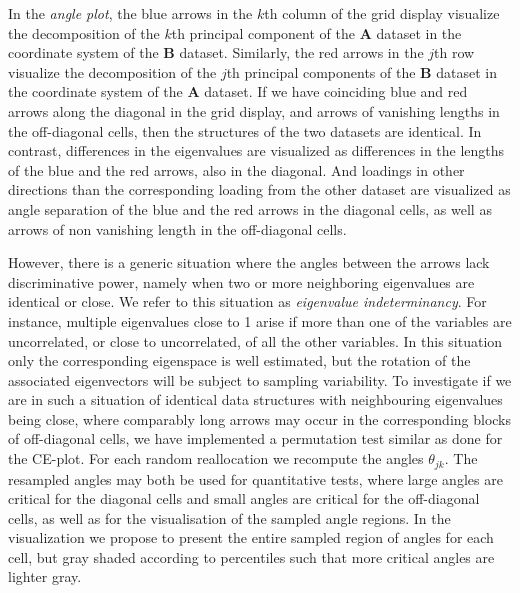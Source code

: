 \documentclass[]{interact}
\theoremstyle{plain}%
\theoremstyle{definition}
\theoremstyle{remark}
\begin{document}
In the \emph{angle plot}, the blue arrows in the $k$th column of the grid display visualize the decomposition of the $k$th principal component of the $\mathbf{A}$ dataset in the coordinate system of the $\mathbf{B}$ dataset. Similarly, the red arrows in the $j$th row visualize the decomposition of the $j$th principal components of the $\mathbf{B}$ dataset in the coordinate system of the $\mathbf{A}$ dataset. If we have coinciding blue and red arrows along the diagonal in the grid display, and arrows of vanishing lengths in the off-diagonal cells, then the structures of the two datasets are identical. In contrast, differences in the eigenvalues are visualized as differences in the lengths of the blue and the red arrows, also in the diagonal. And loadings in other directions than the corresponding loading from the other dataset are visualized as angle separation of the blue and the red arrows in the diagonal cells, as well as arrows of non vanishing length in the off-diagonal cells.

However, there is a generic situation where the angles between the arrows lack discriminative power, namely when two or more neighboring eigenvalues are identical or close. We refer to this situation as \textit{eigenvalue indeterminancy}. For instance, multiple eigenvalues close to 1 arise if more than one of the variables are uncorrelated, or close to uncorrelated, of all the other variables. In this situation only the corresponding eigenspace is well estimated, but the rotation of the associated eigenvectors will be subject to sampling variability. To investigate if we are in such a situation of identical data structures with neighbouring eigenvalues being close, where comparably long arrows may occur in the corresponding blocks of off-diagonal cells, we have implemented a permutation test similar as done for the CE-plot. For each random reallocation we recompute the angles $\theta_{jk}$. The resampled angles may both be used for quantitative tests, where large angles are critical for the diagonal cells and small angles are critical for the off-diagonal cells, as well as for the visualisation of the sampled angle regions. In the visualization we propose to present the entire sampled region of angles for each cell, but gray shaded according to percentiles such that more critical angles are lighter gray. %
\end{document}
